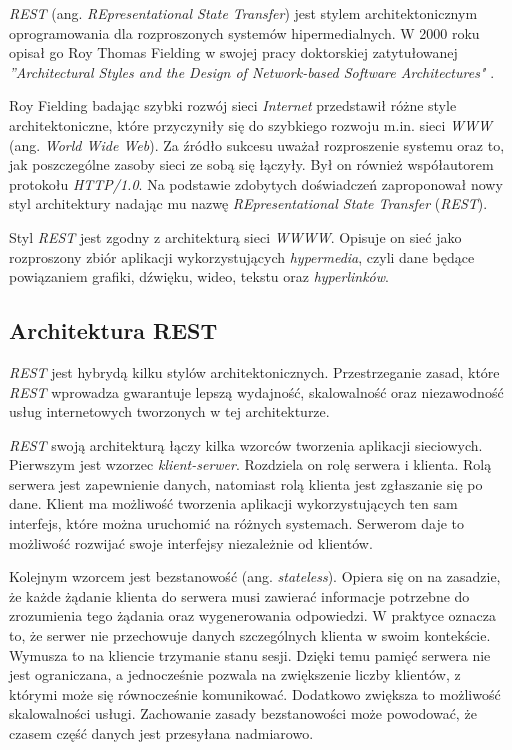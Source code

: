 \textsl{REST} (ang. \textsl{REpresentational State Transfer}) jest stylem architektonicznym oprogramowania dla rozproszonych systemów hipermedialnych. W 2000 roku opisał go Roy Thomas Fielding w swojej pracy doktorskiej zatytułowanej \textsl{''Architectural Styles and the Design of Network-based Software Architectures"} \cite{restinpractice}.

Roy Fielding badając  szybki rozwój sieci \textsl{Internet} przedstawił różne style architektoniczne, które przyczyniły się do szybkiego rozwoju m.in. sieci \textsl{WWW} (ang. \textsl{World Wide Web}). Za źródło sukcesu  uważał rozproszenie systemu oraz to, jak poszczególne zasoby sieci ze sobą się łączyły. Był on również współautorem protokołu \textsl{HTTP/1.0}. Na podstawie zdobytych doświadczeń zaproponował nowy styl  architektury nadając mu nazwę \textsl{REpresentational State Transfer} (\textsl{REST}).  

Styl \textsl{REST} jest  zgodny z architekturą sieci \textsl{WWWW}. Opisuje on sieć jako rozproszony zbiór aplikacji wykorzystujących \textsl{hypermedia}, czyli dane będące powiązaniem grafiki, dźwięku, wideo, tekstu oraz \textsl{hyperlinków}. 

\subsection{Architektura REST}
\textsl{REST} jest hybrydą kilku stylów architektonicznych. Przestrzeganie zasad, które \textsl{REST} wprowadza gwarantuje lepszą wydajność, skalowalność oraz niezawodność usług internetowych tworzonych w tej architekturze. 

\textsl{REST} swoją architekturą łączy kilka wzorców tworzenia aplikacji sieciowych.
Pierwszym  jest wzorzec \textsl{klient-serwer}. Rozdziela on rolę serwera i klienta. Rolą serwera jest zapewnienie danych, natomiast rolą klienta jest zgłaszanie się po dane. Klient ma możliwość tworzenia aplikacji wykorzystujących ten sam interfejs, które można uruchomić na różnych systemach. Serwerom daje to możliwość rozwijać swoje interfejsy niezależnie od klientów. 

Kolejnym wzorcem jest bezstanowość (ang. \textsl{stateless}). Opiera się on na zasadzie, że każde żądanie klienta do serwera musi zawierać informacje potrzebne do zrozumienia tego żądania oraz wygenerowania odpowiedzi. W praktyce oznacza to, że serwer nie przechowuje danych szczególnych klienta w swoim kontekście. Wymusza to na kliencie trzymanie stanu sesji. Dzięki temu pamięć serwera nie jest ograniczana, a jednocześnie pozwala na zwiększenie liczby klientów, z którymi może się równocześnie komunikować. Dodatkowo zwiększa to możliwość skalowalności usługi. Zachowanie zasady bezstanowości może powodować, że czasem część danych jest przesyłana nadmiarowo.

